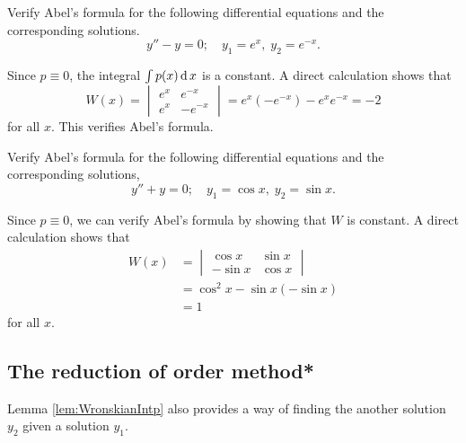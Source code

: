   \begin{example}
  Verify Abel’s formula for the following differential equations and the corresponding solutions.
  \[y''-y=0;\quad y_1=e^x,\; y_2=e^{-x}.\]
  \end{example}
  \begin{solution}
  Since $p\equiv0$, the integral $\int p(x)\operatorname{d} x$ is a constant. A direct calculation shows that 
  \[W(x)=\begin{vmatrix}
    e^x & e^{-x} \\ e^x & -e^{-x}
  \end{vmatrix}=e^x(-e^{-x})-e^xe^{-x}=-2 \]
  for all $x$.
  This verifies Abel's formula.
  \end{solution}
  \begin{exercise}
  Verify Abel’s formula for the following differential equations and the corresponding solutions,
  \[y''+ y=0;\quad y_1=\cos x,\; y_2=\sin x.\]
  \end{exercise}
  \begin{exersol}
  Since $p\equiv0$, we can verify Abel’s formula by showing that $W$ is constant. A direct calculation shows that 
  \[\begin{aligned} W(x)&=
  \begin{vmatrix}
    \cos x & \sin x \\ -\sin x & \cos x
  \end{vmatrix}\\
  &=\cos^2x-\sin x(-\sin x)\\
  &=1
  \end{aligned}\]
  for all $x$.
  \end{exersol}

  
\subsection{The reduction of order method*}\label{sec:ReductionOfOrder}
Lemma \ref{lem:WronskianIntp} also provides a way of finding the another solution $y_2$ given a solution $y_1$.

